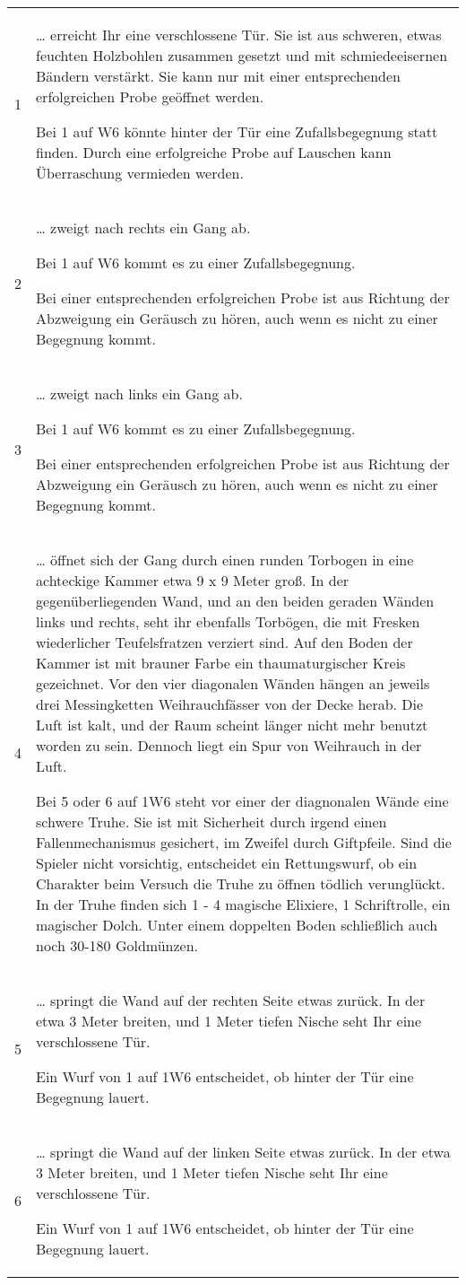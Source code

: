 \documentclass[11pt]{wbzine}
\begin{document}
\begin{tabularx}{\columnwidth}{cZ}
\def\labelenumi{\arabic{enumi}.}
1 & 
  \ldots{} erreicht Ihr eine verschlossene Tür. Sie ist aus schweren,
  etwas feuchten Holzbohlen zusammen gesetzt und mit schmiedeeisernen
  Bändern verstärkt. Sie kann nur mit einer entsprechenden erfolgreichen
  Probe geöffnet werden.

  Bei 1 auf W6 könnte hinter der Tür eine Zufallsbegegnung statt finden.
  Durch eine erfolgreiche Probe auf Lauschen kann Überraschung vermieden
  werden.
\\
2 & 
  \ldots{} zweigt nach rechts ein Gang ab.

  Bei 1 auf W6 kommt es zu einer Zufallsbegegnung.

  Bei einer entsprechenden erfolgreichen Probe ist aus Richtung der
  Abzweigung ein Geräusch zu hören, auch wenn es nicht zu einer
  Begegnung kommt.
\\
3 & 
  \ldots{} zweigt nach links ein Gang ab.

  Bei 1 auf W6 kommt es zu einer Zufallsbegegnung.

  Bei einer entsprechenden erfolgreichen Probe ist aus Richtung der
  Abzweigung ein Geräusch zu hören, auch wenn es nicht zu einer
  Begegnung kommt.
\\
4 & 
  \ldots{} öffnet sich der Gang durch einen runden Torbogen in eine
  achteckige Kammer etwa 9 x 9 Meter groß. In der gegenüberliegenden
  Wand, und an den beiden geraden Wänden links und rechts, seht ihr
  ebenfalls Torbögen, die mit Fresken wiederlicher Teufelsfratzen
  verziert sind. Auf den Boden der Kammer ist mit brauner Farbe ein
  thaumaturgischer Kreis gezeichnet. Vor den vier diagonalen Wänden
  hängen an jeweils drei Messingketten Weihrauchfässer von der Decke
  herab. Die Luft ist kalt, und der Raum scheint länger nicht mehr
  benutzt worden zu sein. Dennoch liegt ein Spur von Weihrauch in der
  Luft.

  Bei 5 oder 6 auf 1W6 steht vor einer der diagnonalen Wände eine
  schwere Truhe. Sie ist mit Sicherheit durch irgend einen
  Fallenmechanismus gesichert, im Zweifel durch Giftpfeile. Sind die
  Spieler nicht vorsichtig, entscheidet ein Rettungswurf, ob ein
  Charakter beim Versuch die Truhe zu öffnen tödlich verunglückt. In der
  Truhe finden sich 1 - 4 magische Elixiere, 1 Schriftrolle, ein
  magischer Dolch. Unter einem doppelten Boden schließlich auch noch
  30-180 Goldmünzen.
\\
5 & 
  \ldots{} springt die Wand auf der rechten Seite etwas zurück. In der
  etwa 3 Meter breiten, und 1 Meter tiefen Nische seht Ihr eine
  verschlossene Tür.

  Ein Wurf von 1 auf 1W6 entscheidet, ob hinter der Tür eine Begegnung
  lauert.
\\
6 & 
  \ldots{} springt die Wand auf der linken Seite etwas zurück. In der
  etwa 3 Meter breiten, und 1 Meter tiefen Nische seht Ihr eine
  verschlossene Tür.

  Ein Wurf von 1 auf 1W6 entscheidet, ob hinter der Tür eine Begegnung
  lauert.
\\
\end{tabularx}
\end{document}
